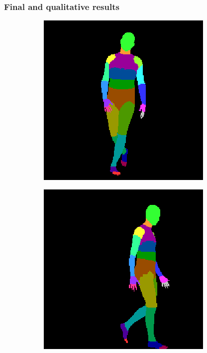 \documentclass{beamer}
\begin{document}
\begin{frame}
\frametitle{Final and qualitative results}

\begin{table}[h!]
  \begin{center}
    
  \end{center}
\end{table}
\begin{figure}
\centering
\begin{subfigure}{.3\textwidth}
\centering
  \includegraphics[scale=0.2]{ung_104_36_c0011_segm_7.png}
\end{subfigure}
\begin{subfigure}{.3\textwidth}
  \centering
  \includegraphics[scale=0.2]{40_02_c0011_segm_19.png}

\end{subfigure}
\end{figure}
\end{frame}
\end{document}
